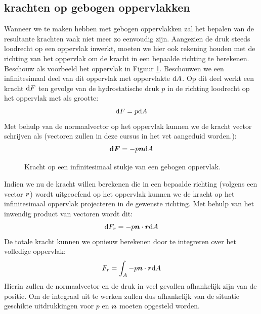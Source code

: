 		\subsection{krachten op gebogen oppervlakken}
Wanneer we te maken hebben met gebogen oppervlakken zal het bepalen van de resultante krachten vaak niet meer zo eenvoudig zijn. Aangezien de druk steeds loodrecht op een oppervlak inwerkt, moeten we hier ook rekening houden met de richting van het oppervlak om de kracht in een bepaalde richting te berekenen. Beschouw als voorbeeld het oppervlak in Figuur \ref{fig:kracht_gebogen_oppervlak}. Beschouwen we een infinitesimaal deel van dit oppervlak met oppervlakte $\mathrm{d} A$. Op dit deel werkt een kracht $\mathrm{d} F$ ten gevolge van de hydrostatische druk $p$ in de richting loodrecht op het oppervlak met als grootte:
\begin{equation}
	\mathrm{d} F = p \mathrm{d} A
\end{equation}
Met behulp van de normaalvector op het oppervlak kunnen we de kracht vector schrijven als (vectoren zullen in deze cursus in het vet aangeduid worden.):
\begin{equation}
	\boldsymbol{\mathrm{d} F} = -p \boldsymbol{n} \mathrm{d} A
\end{equation}
\begin{figure}[htb]
	\centering
	
	\caption{Kracht op een infinitesimaal stukje van een gebogen oppervlak.}
	\label{fig:kracht_gebogen_oppervlak}
\end{figure}
Indien we nu de kracht willen berekenen die in een bepaalde richting (volgens een vector $\boldsymbol{r}$) wordt uitgeoefend op het oppervlak kunnen we de kracht op het infinitesimaal oppervlak projecteren in de gewenste richting. Met behulp van het inwendig product van vectoren wordt dit:
\begin{equation}
	\mathrm{d} F_r = -p \boldsymbol{n} \cdot \boldsymbol{r} \mathrm{d} A
\end{equation}
De totale kracht kunnen we opnieuw berekenen door te integreren over het volledige oppervlak:
\begin{equation}
	F_r = \int_A -p \boldsymbol{n} \cdot \boldsymbol{r} \mathrm{d} A
\end{equation}
Hierin zullen de normaalvector en de druk in veel gevallen afhankelijk zijn van de positie. Om de integraal uit te werken zullen dus afhankelijk van de situatie geschikte uitdrukkingen voor $p$ en $\boldsymbol{n}$ moeten opgesteld worden.

